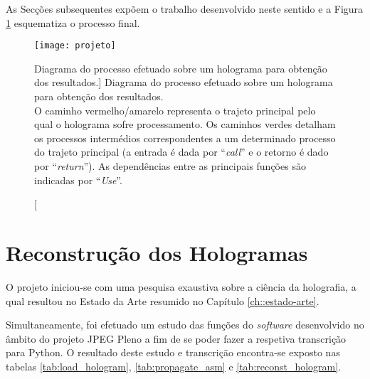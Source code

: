 As Secções subsequentes expõem o trabalho desenvolvido neste sentido e a Figura \ref{fig:projeto} esquematiza o processo final.

\begin{figure}[!htbp]
    \centering
    \texttt{[image: projeto]}
    \caption
        [Diagrama do processo efetuado sobre um holograma para obtenção dos resultados.]
        {
            Diagrama do processo efetuado sobre um holograma para obtenção dos resultados.\\
            O caminho vermelho/amarelo representa o trajeto principal pelo qual o holograma sofre processamento. Os caminhos verdes detalham os processos intermédios correspondentes a um determinado processo do trajeto principal (a entrada é dada por ``\textit{call}'' e o retorno é dado por ``\textit{return}''). As dependências entre as principais funções são indicadas por ``\textit{Use}''.\\

        }
    \label{fig:projeto}
\end{figure}


\section{Reconstrução dos Hologramas}
\label{sec::imp-test:reconst-hologram}

O projeto iniciou-se com uma pesquisa exaustiva sobre a ciência da holografia, a qual resultou no Estado da Arte resumido no Capítulo \ref{ch::estado-arte}.

Simultaneamente, foi efetuado um estudo das funções do \textit{software} desenvolvido no âmbito do projeto JPEG Pleno a fim de se poder fazer a respetiva transcrição para Python. O resultado deste estudo e transcrição encontra-se exposto nas tabelas \ref{tab:load_hologram}, \ref{tab:propagate_asm} e \ref{tab:reconst_hologram}.


